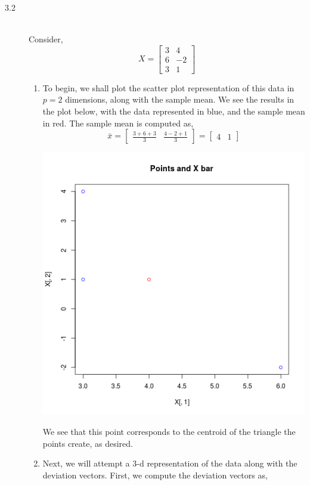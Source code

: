 \documentclass[letterpaper,10pt]{article}
\begin{document}
\begin{description}
\item[3.2]\hfill \\
Consider,
\[X=\begin{bmatrix}
3 & 4\\6 & -2\\ 3 & 1
\end{bmatrix} \]
\begin{enumerate}[label=\alph*.]
\item To begin, we shall plot the scatter plot representation of this data in $p=2$ dimensions, along with the sample mean. We see the results in the plot below, with the data represented in blue, and the sample mean in red. The sample mean is computed as,
\[\bar{x}=\begin{bmatrix}
\frac{3+6+3}{3} & \frac{4-2+1}{3}
\end{bmatrix}=\begin{bmatrix}
4 & 1
\end{bmatrix} \]
\begin{center}
\includegraphics[scale=0.65]{32a.png}
\end{center}
We see that this point corresponds to the centroid of the triangle the points create, as desired.
\item Next, we will attempt a 3-d representation of the data along with the deviation vectors. First, we compute the deviation vectors as,

\end{enumerate}
\end{description}
\end{document}
